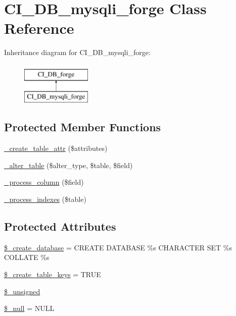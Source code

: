 \hypertarget{class_c_i___d_b__mysqli__forge}{}\section{C\+I\+\_\+\+D\+B\+\_\+mysqli\+\_\+forge Class Reference}
\label{class_c_i___d_b__mysqli__forge}
Inheritance diagram for C\+I\+\_\+\+D\+B\+\_\+mysqli\+\_\+forge\+:\begin{figure}[H]
\begin{center}
\leavevmode
\includegraphics[height=2.000000cm]{class_c_i___d_b__mysqli__forge}
\end{center}
\end{figure}
\subsection*{Protected Member Functions}
\begin{DoxyCompactItemize}
\item 
\hyperlink{class_c_i___d_b__mysqli__forge_a10b25326d82f6ddd9af1935e52e42b72}{\+\_\+create\+\_\+table\+\_\+attr} (\$attributes)
\item 
\hyperlink{class_c_i___d_b__mysqli__forge_a41c6cae02f2fda8b429ad0afb9509426}{\+\_\+alter\+\_\+table} (\$alter\+\_\+type, \$table, \$field)
\item 
\hyperlink{class_c_i___d_b__mysqli__forge_a8f38f1c5b5dddecca4befbe393f3f299}{\+\_\+process\+\_\+column} (\$field)
\item 
\hyperlink{class_c_i___d_b__mysqli__forge_ae0bdb4ea3418590d1894c5b621b5ca50}{\+\_\+process\+\_\+indexes} (\$table)
\end{DoxyCompactItemize}
\subsection*{Protected Attributes}
\begin{DoxyCompactItemize}
\item 
\hyperlink{class_c_i___d_b__mysqli__forge_acd23c9a8735806155f1a5d0a87c151f2}{\$\+\_\+create\+\_\+database} = \textquotesingle{}C\+R\+E\+A\+T\+E D\+A\+T\+A\+B\+A\+S\+E \%s C\+H\+A\+R\+A\+C\+T\+E\+R S\+E\+T \%s C\+O\+L\+L\+A\+T\+E \%s\textquotesingle{}
\item 
\hyperlink{class_c_i___d_b__mysqli__forge_a73e07acdd35c948ad353903c2827af6e}{\$\+\_\+create\+\_\+table\+\_\+keys} = T\+R\+U\+E
\item 
\hyperlink{class_c_i___d_b__mysqli__forge_aae977ae6d61fa183f0b25422b6ddc31c}{\$\+\_\+unsigned}
\item 
\hyperlink{class_c_i___d_b__mysqli__forge_ae58fe6a5104d4a069a49b27533ce808f}{\$\+\_\+null} = \textquotesingle{}N\+U\+L\+L\textquotesingle{}
\end{DoxyCompactItemize}
